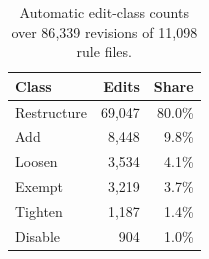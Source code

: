 \begin{table}[t]
\centering
\caption{Automatic edit-class counts over 86{,}339 revisions of 11{,}098 rule files.}
\label{tab:edit_class_counts}
\small
\setlength{\tabcolsep}{10pt}
\renewcommand{\arraystretch}{1.25}
\begin{tabular}{lrr}
\toprule
\textbf{Class} & \textbf{Edits} & \textbf{Share} \\
\midrule
\rowcolor{rowband}
Restructure & 69{,}047 & 80.0\% \\
Add & 8{,}448 & 9.8\% \\
\rowcolor{rowband}
Loosen & 3{,}534 & 4.1\% \\
Exempt & 3{,}219 & 3.7\% \\
\rowcolor{rowband}
Tighten & 1{,}187 & 1.4\% \\
Disable & 904 & 1.0\% \\
\bottomrule
\end{tabular}
\end{table}